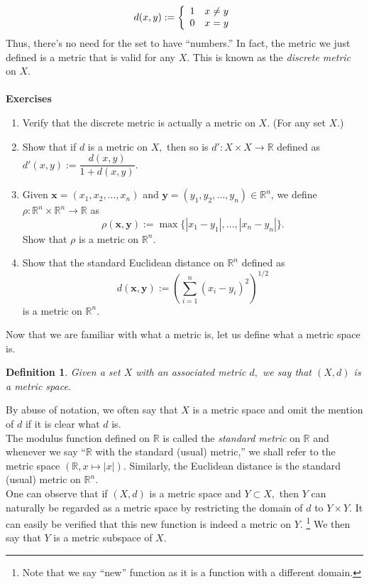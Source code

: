 \documentclass{article}
\newtheorem{defn}{Definition}
\begin{document}
	\[d(x, y) := \left\{\begin{array}{c r}
		1 & x \neq y\\
		0 & x = y
	\end{array}
	\right.\]
	Thus, there's no need for the set to have ``numbers.'' In fact, the metric we just defined is a metric that is valid for any $X.$ This is known as the \emph{discrete metric} on $X.$\\~\\
	\textbf{Exercises} 
	\begin{enumerate}[nosep]
		\item Verify that the discrete metric is actually a metric on $X.$ (For any set $X.$)
		\item Show that if $d$ is a metric on $X,$ then so is $d' : X \times X \to \mathbb{R}$ defined as $d'(x, y) := \dfrac{d(x, y)}{1 + d(x, y)}.$
		\item Given $\textbf{x} = (x_1, x_2, \ldots, x_n)$ and $\textbf{y} = (y_1, y_2, \ldots, y_n) \in \mathbb{R}^n$, we define $\rho:\mathbb{R}^n\times \mathbb{R}^n \to \mathbb{R}$ as
		\[\rho(\textbf{x}, \textbf{y}) := \max\{|x_1 - y_1|, \ldots, |x_n - y_n|\}.\]
		Show that $\rho$ is a metric on $\mathbb{R}^n.$
		\item Show that the standard Euclidean distance on $\mathbb{R}^n$ defined as 
		\[d(\textbf{x}, \textbf{y}) := \left(\sum_{i=1}^{n}(x_i - y_i)^2\right)^{1/2}\]
		is a metric on $\mathbb{R}^n.$
	\end{enumerate}
	Now that we are familiar with what a metric is, let us define what a metric space is.
	\begin{defn}
		Given a set $X$ with an associated metric $d,$ we say that $(X, d)$ is a metric space.
	\end{defn}
	By abuse of notation, we often say that $X$ is a metric space and omit the mention of $d$ if it is clear what $d$ is.\\
	The modulus function defined on $\mathbb{R}$ is called the \emph{standard metric} on $\mathbb{R}$ and whenever we say ``$\mathbb{R}$ with the standard (usual) metric,'' we shall refer to the metric space $(\mathbb{R}, x \mapsto |x|).$ Similarly, the Euclidean distance is the standard (usual) metric on $\mathbb{R}^n.$\\
	One can observe that if $(X, d)$ is a metric space and $Y \subset X,$ then $Y$ can naturally be regarded as a metric space by restricting the domain of $d$ to $Y \times Y.$ It can easily be verified that this new function is indeed a metric on $Y.$ \footnote{Note that we say ``new'' function as it is a function with a different domain.} We then say that $Y$ is a metric subspace of $X.$
\end{document}
